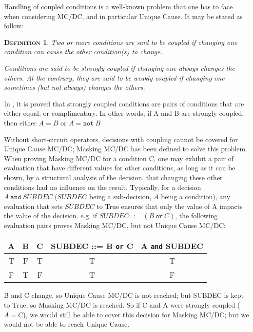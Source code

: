\documentclass[a4paper,12pt,twoside]{article}
\newcommand{\adaand}{\texttt{and}}
\newcommand{\adaor}{\texttt{or}}
\newcommand{\adanot}{\texttt{not}}
\newtheorem{definition}{\textsc{Definition}}
\begin{document}
Handling of coupled conditions is a well-known problem that one has
to face when considering MC/DC, and in particular Unique Cause. It may
be stated as follow:

\begin{definition}
  \label{def:coupled-conditions}
  Two or more conditions are said to be coupled if changing one condition
  can cause the other condition(s) to change.

  Conditions are said to be strongly coupled if changing one always
  changes the others. At the contrary, they are said to be weakly
  coupled if changing one sometimes (but not always) changes the others.
\end{definition}

In \cite{rcdc-from}, it is proved that strongly coupled conditions
are pairs of conditions that are either equal, or complimentary.
In other words, if A and B are strongly coupled, then either $A = B$
or $A = \adanot{} \ B$

Without short-circuit operators, decisions with coupling cannot be
covered for Unique Cause MC/DC; Masking MC/DC has been defined to
solve this problem.  When proving Masking MC/DC for a condition C, one
may exhibit a pair of evaluation that have different values for other
conditions, as long as it can be shown, by a structural analysis of
the decision, that changing these other conditions had no influence
on the result. Typically, for a decision $A \ \adaand{} \ SUBDEC$ ($SUBDEC$
being a sub-decision, $A$ being a condition), any evaluation that sets
$SUBDEC$ to True ensures that only the value of A impacts the value of the
decision. e.g. if $SUBDEC ::= (B \ \adaor{} \ C)$, the following evaluation
pairs proves Masking MC/DC, but not Unique Cause MC/DC:

\begin{center}
\begin{tabular}{|c|c|c||c||c|}
\hline
A & B & C & SUBDEC ::= B \adaor{} C & A \adaand{} SUBDEC \\ \hline
T & F & T & T                       & T \\ \hline
F & T & F & T                       & F \\ \hline
\end{tabular}
\end{center}

B and C change, so Unique Cause MC/DC is not reached; but SUBDEC is kept
to True, so Masking MC/DC is reached. So if C and A were strongly
coupled ($A = C$), we would still be able to cover this decision for Masking
MC/DC; but we would not be able to reach Unique Cause.
\end{document}
